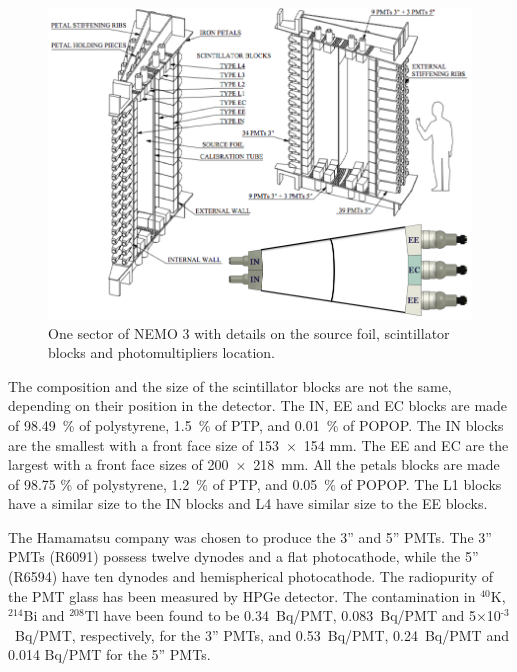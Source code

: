 \documentclass[main.tex]{subfiles}
\begin{document}
\begin{figure}[h!]
\begin{center}
\includegraphics[scale=0.34]{pictures/Chap3/SectorDetailedPMTconfig.png}
\caption{One sector of NEMO 3 with details on the source foil, scintillator blocks and photomultipliers location.}
\label{SectorDetailedPMTconfig}
\end{center}
\end{figure}


\NI The composition and the size of the scintillator blocks are not the same, depending on their position in the detector. The IN, EE and EC blocks are made of 98.49~\% of polystyrene, 1.5~\% of PTP, and 0.01~\% of POPOP. The IN blocks are the smallest with a front face size of 153~$\times$~154 mm. The EE and EC are the largest with a front face sizes of 200~$\times$~218~mm. All the petals blocks are made of 98.75 \% of polystyrene, 1.2~\% of PTP, and 0.05~\% of POPOP. The L1 blocks have a similar size to the IN blocks and L4 have similar size to the EE blocks. 


\bigskip


\NI The Hamamatsu company was chosen to produce the 3'' and 5'' PMTs. The 3'' PMTs (R6091) possess twelve dynodes and a flat photocathode, while the 5'' (R6594) have ten dynodes and hemispherical photocathode. The radiopurity of the PMT glass has been measured by HPGe detector. The contamination in $^{\text{40}}$K, $^{\text{214}}$Bi and $^{\text{208}}$Tl have been found to be 0.34~Bq/PMT, 0.083~Bq/PMT and 5$\times$10$^{\text{-3}}$~Bq/PMT, respectively, for the 3'' PMTs, and 0.53~Bq/PMT, 0.24~Bq/PMT and 0.014 Bq/PMT for the 5'' PMTs.
\end{document}
